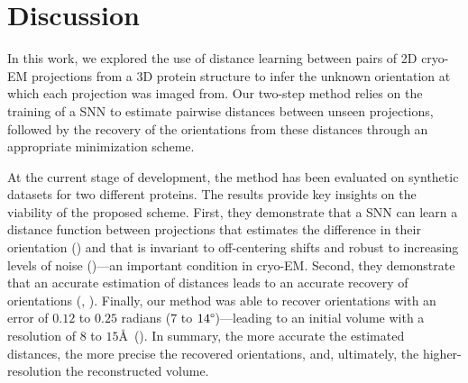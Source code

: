 \section{Discussion}\label{sec:discussion}

In this work, we explored the use of distance learning between pairs of 2D cryo-EM projections from a 3D protein structure to infer the unknown orientation at which each projection was imaged from.
Our two-step method relies on the training of a SNN to estimate pairwise distances between unseen projections, followed by the recovery of the orientations from these distances through an appropriate minimization scheme.


At the current stage of development, the method has been evaluated on synthetic datasets for two different proteins.
The results provide key insights on the viability of the proposed scheme.
First, they demonstrate that a SNN can learn a distance function between projections that estimates the difference in their orientation () and that is invariant to off-centering shifts and robust to increasing levels of noise ()---an important condition in cryo-EM\@.
Second, they demonstrate that an accurate estimation of distances leads to an accurate recovery of orientations (, ).
Finally, our method was able to recover orientations with an error of $0.12$ to $0.25$ radians ($7$ to $14\degree$)---leading to an initial volume
with a resolution of $8$ to $15$\AA\ ().
In summary, the more accurate the estimated distances, the more precise the recovered orientations, and, ultimately, the higher-resolution the reconstructed volume.

